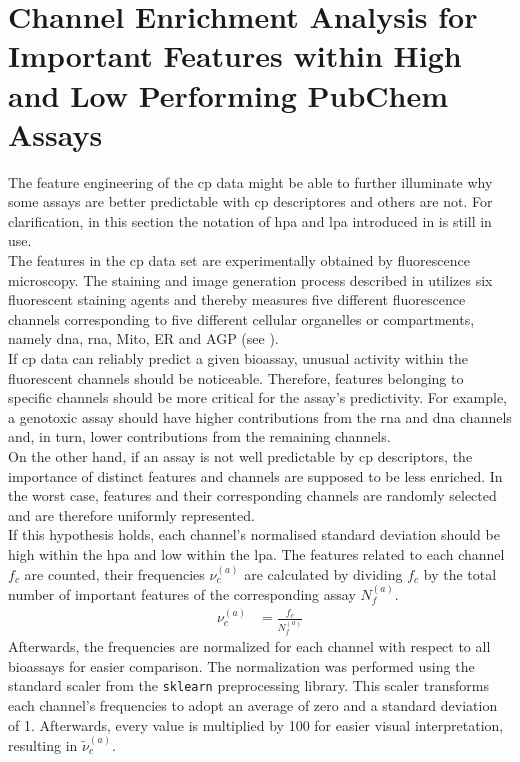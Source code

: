 \section{Channel Enrichment Analysis for Important Features within High and Low Performing PubChem Assays}\label{sec:channelsresults}
The feature engineering of the \ac{cp} data might be able to further illuminate why some assays are better predictable with \ac{cp} descriptores and others are not. For clarification, in this section the notation of \acl{hpa} and \acl{lpa} introduced in  is still in use.\\
The features in the \ac{cp} data set are experimentally obtained by fluorescence microscopy. The staining and image generation process described in  utilizes six fluorescent staining agents and thereby measures five different fluorescence channels corresponding to five different cellular organelles or compartments, namely \ac{dna}, \ac{rna}, Mito, ER and AGP (see ).\\
If \ac{cp} data can reliably predict a given bioassay, unusual activity within the fluorescent channels should be noticeable. Therefore, features belonging to specific channels should be more critical for the assay's predictivity. For example, a genotoxic assay should have higher contributions from the \ac{rna} and \ac{dna} channels and, in turn, lower contributions from the remaining channels.\\
On the other hand, if an assay is not well predictable by \ac{cp} descriptors, the importance of distinct features and channels are supposed to be less enriched. In the worst case, features and their corresponding channels are randomly selected and are therefore uniformly represented.\\
If this hypothesis holds, each channel's normalised standard deviation should be high within the \acl{hpa} and low within the \acl{lpa}. The features related to each channel $f_c$ are counted, their frequencies $\nu_c^{(a)}$ are calculated by dividing $f_c$ by the total number of important features of the corresponding assay $N_f^{(a)}$.
\begin{align}\label{eq:channelsfreq}
\nu_c^{(a)} & = \frac{f_c}{N_f^{(a)}}
\end{align}
Afterwards, the frequencies are normalized for each channel with respect to all bioassays for easier comparison. The normalization was performed using the standard scaler from the \texttt{sklearn} preprocessing library.\cite{Pedregosa2012} This scaler transforms each channel's frequencies to adopt an average of zero and a standard deviation of 1. Afterwards, every value is multiplied by \num{100} for easier visual interpretation, resulting in $\widetilde{\nu}_c^{(a)}$.
